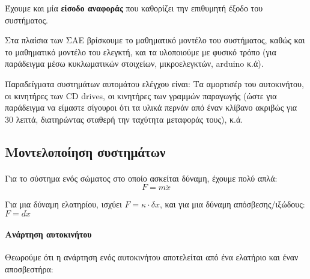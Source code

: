 \documentclass[11pt,a4paper,notitlepage,fleqn,draft]{article}
\begin{document}
Έχουμε και μία \textbf{είσοδο αναφοράς} που καθορίζει την επιθυμητή έξοδο του συστήματος.

Στα πλαίσια των ΣΑΕ βρίσκουμε το μαθηματικό μοντέλο του συστήματος, καθώς και το μαθηματικό
μοντέλο του ελεγκτή, και τα υλοποιούμε με φυσικό τρόπο (για παράδειγμα μέσω κυκλωματικών
στοιχείων, μικροελεγκτών, arduino κ.ά).

Παραδείγματα συστημάτων αυτομάτου ελέγχου είναι: Τα αμορτισέρ του αυτοκινήτου, οι κινητήρες
των CD drives, οι κινητήρες των γραμμών παραγωγής (ώστε για παράδειγμα να είμαστε σίγουροι
ότι τα υλικά περνάν από έναν κλίβανο ακριβώς για 30 λεπτά, διατηρώντας σταθερή την
ταχύτητα μεταφοράς τους), κ.ά.

\subsection{Μοντελοποίηση συστημάτων}
\paragraph{}
Για το σύστημα ενός σώματος στο οποίο ασκείται δύναμη, έχουμε πολύ απλά:
\[
	F = m\ddot x
\]

Για μια δύναμη ελατηρίου, ισχύει \( F = \kappa \cdot \delta x \), και για μια δύναμη
απόσβεσης/ιξώδους: \( F = d\dot x \)

\paragraph{Ανάρτηση αυτοκινήτου}
Θεωρούμε ότι η ανάρτηση ενός αυτοκινήτου αποτελείται από ένα ελατήριο και έναν αποσβεστήρα:

\end{document}
